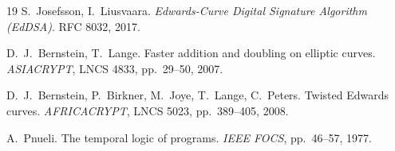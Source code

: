 \documentclass[10pt,twocolumn]{article}
\begin{document}
\begin{thebibliography}{19}
 S.~Josefsson, I.~Liusvaara.
\emph{Edwards-Curve Digital Signature Algorithm (EdDSA)}. RFC 8032, 2017.

 D.~J.~Bernstein, T.~Lange.
Faster addition and doubling on elliptic curves.
\emph{ASIACRYPT}, LNCS 4833, pp.~29--50, 2007.

 D.~J.~Bernstein, P.~Birkner, M.~Joye, T.~Lange,
C.~Peters. Twisted Edwards curves.
\emph{AFRICACRYPT}, LNCS 5023, pp.~389--405, 2008.

 A.~Pnueli. The temporal logic of programs.
\emph{IEEE FOCS}, pp.~46--57, 1977.

\end{thebibliography}
\end{document}
